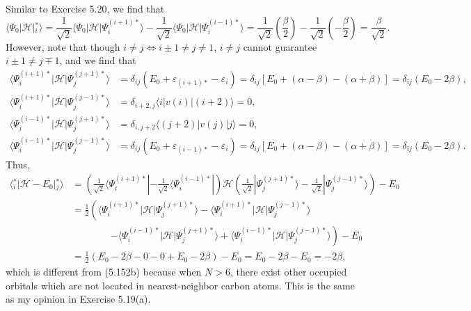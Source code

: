 \documentclass[a4paper]{book}
\newcounter{solution}[chapter]
\begin{document}
	\begin{solution}
	Similar to Exercise 5.20, we find that
	\[
		\langle \Psi_0 | \mathscr{H} | {}^*_i \rangle = \frac{1}{ \sqrt{2} } \langle \Psi_0 | \mathscr{H} | \Psi^{(i+1)*}_i \rangle - \frac{1}{ \sqrt{2} } \langle \Psi_0 | \mathscr{H} | \Psi^{(i-1)*}_i \rangle = \frac{1}{ \sqrt{2} } \left( \frac{ \beta }{2} \right) - \frac{1}{ \sqrt{2} } \left( - \frac{ \beta }{2} \right) = \frac{ \beta }{ \sqrt{2} }.
	\]
	However, note that though $i \neq j \Leftrightarrow i \pm 1 \neq j \neq 1$, $i \neq j$ cannot guarantee $i \pm 1 \neq j \mp 1$, and we find that
	\begin{align*}
		\langle \Psi^{(i+1)*}_i | \mathscr{H} | \Psi^{(j+1)*}_j \rangle &= \delta_{ij} ( E_0 + \varepsilon_{(i+1)*} - \varepsilon_{i} ) = \delta_{ij} \left[ E_0 + ( \alpha - \beta ) - ( \alpha + \beta ) \right] = \delta_{ij} \left( E_0 - 2\beta \right) , \\
		\langle \Psi^{(i+1)*}_i | \mathscr{H} | \Psi^{(j-1)*}_j \rangle &= \delta_{i+2,j} \langle i | v(i) | (i+2) \rangle = 0, \\
		\langle \Psi^{(i-1)*}_i | \mathscr{H} | \Psi^{(j+1)*}_j \rangle &= \delta_{i,j+2} \langle (j+2) | v(j) | j \rangle = 0, \\
		\langle \Psi^{(i-1)*}_i | \mathscr{H} | \Psi^{(j-1)*}_j \rangle &= \delta_{ij} ( E_0 + \varepsilon_{(i-1)*} - \varepsilon_{i} ) = \delta_{ij} \left[ E_0 + ( \alpha - \beta ) - ( \alpha + \beta ) \right] = \delta_{ij} \left( E_0 - 2\beta \right) .
	\end{align*}
	Thus,
	\begin{align*}
		\langle {}^*_i | \mathscr{H} - E_0 | {}^*_j \rangle &= \left( \frac{1}{ \sqrt{2} } \langle \Psi^{(i+1)*}_i | - \frac{1}{ \sqrt{2} } \langle \Psi^{(i-1)*}_i | \right) \mathscr{H} \left( \frac{1}{ \sqrt{2} } | \Psi^{(j+1)*}_j \rangle - \frac{1}{ \sqrt{2} } | \Psi^{(j-1)*}_j \rangle \right) - E_0 \\
		&= \frac{1}{2} \left( \langle \Psi^{(i+1)*}_i | \mathscr{H} | \Psi^{(j+1)*}_j \rangle - \langle \Psi^{(i+1)*}_i | \mathscr{H} | \Psi^{(j-1)*}_j \rangle \right.\\
		&\hspace{4em} \left. - \langle \Psi^{(i-1)*}_i | \mathscr{H} | \Psi^{(j+1)*}_j \rangle + \langle \Psi^{(i-1)*}_i | \mathscr{H} | \Psi^{(j-1)*}_j \rangle \right) - E_0 \\
		&= \frac{1}{2} \left( E_0 - 2\beta - 0 - 0 + E_0 - 2\beta \right) - E_0 = E_0 - 2\beta - E_0 = -2 \beta,
	\end{align*}
	which is different from (5.152b) because when $N>6$, there exist other occupied orbitals which are not located in nearest-neighbor carbon atoms. This is the same as my opinion in Exercise 5.19(a).
	

\end{solution}
\end{document}
